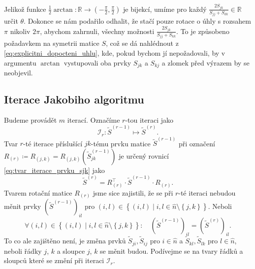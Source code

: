 \documentclass[czech]{article}
\newcommand\R{\ensuremath{\mathbb{R}}}
\renewcommand\tilde\widetilde
\renewcommand\hat\widehat
\begin{document}
Jelikož funkce $\frac{1}{2}\arctan: \R \to (-\frac{\pi}{2},\frac{\pi}{2})$ je bijekcí, umíme pro každý $\frac{2S_{jk}}{S_{jj} + S_{kk}} \in \R$ určit $\theta$. Dokonce se nám podařilo odhalit, že stačí pouze rotace o úhly s rozsahem $\pi$ nikoliv $2\pi$, abychom zahrnuli, všechny možnosti $\frac{2S_{jk}}{S_{jj} + S_{kk}}$. To je způsobeno požadavkem na symetrii matice $S$, což se dá nahlédnout z \ref{eq:explicitni_dopocteni_uhlu}, kde, pokud bychom jí nepožadovali, by v argumentu $\arctan$ vystupovali oba prvky $S_{jk}$ a $S_{kj}$ a zlomek před výrazem by se neobjevil.


\subsection{Iterace Jakobiho algoritmu}%
\label{sec:iterace_jakobiho_algoritmu}
Budeme provádět $m$ iterací. Označíme $r$-tou iteraci jako
\[
	\mathscr{I}_{r}: \tilde{S}^{(r-1)} \mapsto \tilde{S}^{(r)}.
\]
Tvar $r$-té iterace příslušící $jk$-tému prvku matice $\tilde{S}^{(r-1)}$ při označení $R_{(r)}\coloneqq R_{(j,k)} = R_{(j,k)}\left(  \tilde{S}^{(r-1)}_{jk} \right)$ je určený rovnicí \ref{eq:tvar_iterace_prvku_sjk} jako
\[
	\tilde{S}^{(r)} = R_{(r)}^{\top}\cdot \tilde{S}^{(r-1)} \cdot R_{(r)}.
\]
Tvarem rotační matice $R_{(r)}$ jsme sice zajistili, že se při $r$-té iteraci nebudou měnit prvky $\left(\tilde{S}^{(r-1)}\right)_{il}$ pro $(i,l) \in \left\{ (i,l) \mid i,l \in \hat{n} \setminus  \left\{ j,k \right\}  \right\} $. Neboli
\[
	\forall(i,l) \in \left\{ (i,l) \mid i,l \in \hat{n} \setminus  \left\{ j,k \right\}  \right\}: \quad \left( \tilde{S}^{(r-1)} \right)_{il} = \left( \tilde{S}^{(r)} \right)_{il}
	.\]
To co ale zajištěno není, je změna prvků $\tilde{S}_{ji}, \tilde{S}_{ij}$ pro $i \in \hat{n}$ a $\tilde{S}_{kl}, \tilde{S}_{lk}$ pro $l \in \hat{n}$,
neboli řádky $j$, $k$ a sloupce $j$,  $k$ se měnit budou. Podívejme se na tvary řádků a sloupců které se změní při iteraci $\mathscr{I}_{r}$.
\end{document}
